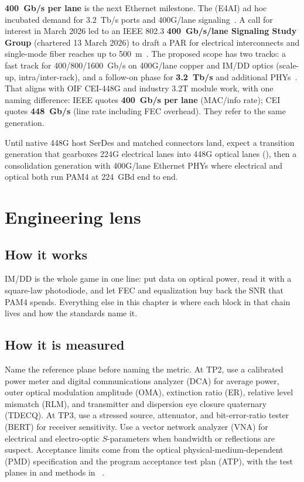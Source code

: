 \textbf{400~Gb/s per lane} is the next Ethernet milestone. The  (E4AI) ad hoc incubated demand for 3.2~Tb/s ports and 400G/lane
signaling~. A call for interest in March 2026 led to an IEEE 802.3
\textbf{400~Gb/s/lane Signaling Study Group} (chartered 13 March 2026) to draft a
PAR for electrical interconnects and single-mode fiber reaches up to
500~m~. The proposed scope has two tracks: a fast track for
400/800/1600~Gb/s on 400G/lane copper and IM/DD optics (scale-up, intra/inter-rack),
and a follow-on phase for \textbf{3.2~Tb/s} and additional PHYs~.
That aligns with OIF CEI-448G and industry 3.2T module work, with one naming
difference: IEEE quotes \textbf{400~Gb/s per lane} (MAC/info rate); CEI quotes
\textbf{448~Gb/s} (line rate including FEC overhead). They refer to the same
generation.

Until native 448G host SerDes and matched connectors land, expect a transition
generation that gearboxes 224G electrical lanes into 448G optical lanes
(), then a consolidation generation with 400G/lane Ethernet
PHYs where electrical and optical both run PAM4 at 224~GBd end to end.

\section{Engineering lens}
\label{sec:imdd-engineering-lens}

\subsection{How it works}

IM/DD is the whole game in one line: put data on optical power, read it with a
square-law photodiode, and let FEC and equalization buy back the SNR that PAM4
spends. Everything else in this chapter is where each block in that chain lives
and how the standards name it.

\subsection{How it is measured}
\label{sec:imdd-how-measured}

Name the reference plane before naming the metric. At TP2, use a calibrated power
meter and digital communications analyzer (DCA) for average power, outer optical
modulation amplitude (OMA), extinction ratio (ER), relative level mismatch (RLM),
and transmitter and dispersion eye closure quaternary (TDECQ). At TP3, use a
stressed source, attenuator, and bit-error-ratio tester (BERT) for receiver
sensitivity. Use a vector network analyzer (VNA) for electrical and electro-optic
$S$-parameters when bandwidth or reflections are suspect. Acceptance limits come
from the optical physical-medium-dependent (PMD) specification and the program
acceptance test plan (ATP), with the test planes in  and
methods in ~\cite{ieee8023dj,lpomsa}.

